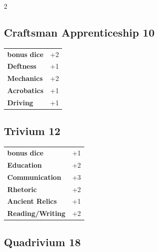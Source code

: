 \begin{multicols}{2}
\begin{tcolorbox}
    \subsection*{Craftsman Apprenticeship \hfill \small{10 }}
    \tcblower




\begin{tabular}{@{}ll@{}}
    \textbf{bonus dice} & +2\\
    \textbf{Deftness} & +1\\
    \textbf{Mechanics} & +2\\
    \textbf{Acrobatics} & +1\\
    \textbf{Driving} & +1\\
\end{tabular}


\end{tcolorbox}

\begin{tcolorbox}
    \subsection*{Trivium \hfill \small{12 }}
    \tcblower




\begin{tabular}{@{}ll@{}}
    \textbf{bonus dice} & +1\\
    \textbf{Education} & +2\\
    \textbf{Communication} & +3\\
    \textbf{Rhetoric} & +2\\
    \textbf{Ancient Relics} & +1\\
    \textbf{Reading/Writing} & +2\\
\end{tabular}


\end{tcolorbox}

\begin{tcolorbox}
    \subsection*{Quadrivium \hfill \small{18 }}
    \tcblower





\end{tcolorbox}
\end{multicols}
